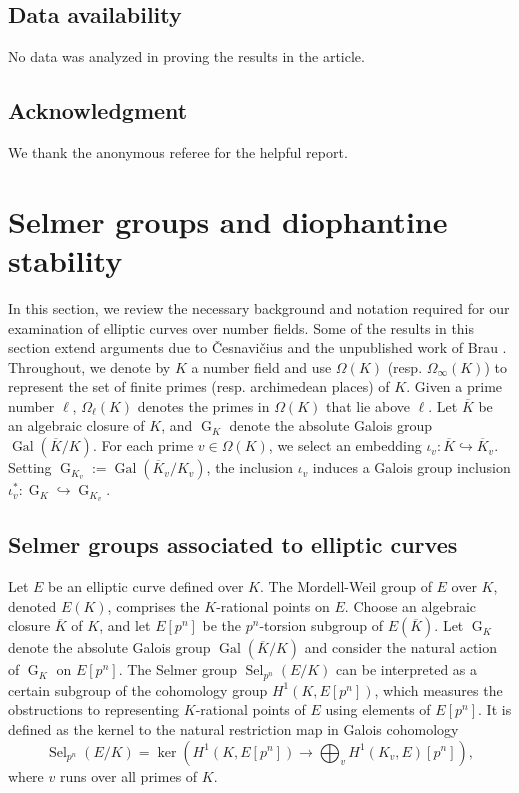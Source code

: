 \documentclass[12pt]{amsart}
\newcommand{\op}[1]{\operatorname{#1}}
\numberwithin{equation}{section}
\begin{document}
\subsection*{Data availability} No data was analyzed in proving the results in the article.

\subsection*{Acknowledgment
} We thank the anonymous referee for the helpful report.

\section{Selmer groups and diophantine stability}\label{s 2}
\par In this section, we review the necessary background and notation required for our examination of elliptic curves over number fields. Some of the results in this section extend arguments due to \v{C}esnavi\v{c}ius \cite{navicius} and the unpublished work of Brau \cite{brau2014selmer}. Throughout, we denote by $K$ a number field and use $\Omega(K)$ (resp. $\Omega_\infty(K)$) to represent the set of finite primes (resp. archimedean places) of $K$. Given a prime number $\ell$, $\Omega_\ell(K)$ denotes the primes in $\Omega(K)$ that lie above $\ell$. Let $\overline{K}$ be an algebraic closure of $K$, and $\operatorname{G}_K$ denote the absolute Galois group $\operatorname{Gal}(\overline{K}/K)$. For each prime $v \in \Omega(K)$, we select an embedding $\iota_v: \overline{K} \hookrightarrow \overline{K}_v$. Setting $\operatorname{G}_{K_v} := \operatorname{Gal}(\overline{K}_v / K_v)$, the inclusion $\iota_v$ induces a Galois group inclusion $\iota_v^*: \operatorname{G}_K \hookrightarrow \operatorname{G}_{K_v}$.

\subsection{Selmer groups associated to elliptic curves}
\par Let $E$ be an elliptic curve defined over $K$. The Mordell-Weil group of $E$ over $K$, denoted $E(K)$, comprises the $K$-rational points on $E$. Choose an algebraic closure $\overline{K}$ of $K$, and let $E[p^n]$ be the $p^n$-torsion subgroup of $E(\overline{K})$. Let $\op{G}_K$ denote the absolute Galois group $\op{Gal}(\overline{K}/K)$ and consider the natural action of $\op{G}_K$ on $E[p^n]$. The Selmer group $\operatorname{Sel}_{p^n}(E/K)$ can be interpreted as a certain subgroup of the cohomology group $H^1(K, E[p^n])$, which measures the obstructions to representing $K$-rational points of $E$ using elements of $E[p^n]$. It is defined as the kernel to the natural restriction map in Galois cohomology
\[ \operatorname{Sel}_{p^n}(E/K) = \ker\left( H^1(K, E[p^n]) \to \bigoplus_v H^1(K_v, E)[p^n] \right), \]
where $v$ runs over all primes of $K$.
\end{document}
